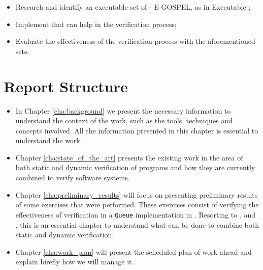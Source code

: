 \begin{itemize}
    \item Research and identify an executable set of \gospellang - E-GOSPEL, as in Executable \gospellang;
    \item Implement \monitors that can help in the verification process;
    \item Evaluate the effectiveness of the verification process with the aforementioned 
    sets.
\end{itemize}

\section{Report Structure}
\label{sec:report_structure}

\begin{itemize}
    \item In Chapter \ref{cha:background} we present the necessary information to understand
        the context of the work, such as the tools, techniques and concepts involved. All 
        the information presented in this chapter is essential to understand the work.
    \item Chapter \ref{cha:state_of_the_art} presents the existing work in the area of 
        both static and dynamic verification of \ocaml programs and how they are currently 
        combined to verify software systems.
    \item Chapter \ref{cha:preliminary_results} will focus on presenting preliminary 
        results of some exercises that were performed. These exercises consist of verifying 
        the effectiveness of verification in a \texttt{Queue} implementation in \ocaml. 
        Resorting to \gospellang, \cameleer and \ortac, this is an essential chapter to understand 
        what can be done to combine both static and dynamic verification.
    \item Chapter \ref{cha:work_plan} will present the scheduled plan of work ahead and explain 
    birefly how we will manage it.
\end{itemize}
